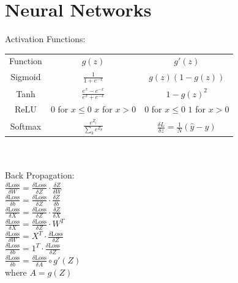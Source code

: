 \documentclass[a4paper, 10pt, twocolumn]{article}
\begin{document}
\section{Neural Networks}
Activation Functions: \\ 
\begin{tabular}{c c c}
	Function & $g(z)$ & $g'(z)$ \\
	Sigmoid & $\frac{1}{1 + e^{-x}}$ & $g(z)(1-g(z))$ \\
	Tanh & $\frac{e^x  - e^{-x}}{e^x + e^{-x}}$ & $1-g(z)^2$ \\
	ReLU & \thead{$0$ for $x \leq 0 $ \\ $x$ for $x>0$} & \thead{$0$ for $x \leq 0 $ \\ $1$ for $x>0$} \\
	Softmax & $\frac{e^{Z_i}}{\sum_k e^{Z_k}}$ & $\frac{\delta L}{\delta z} = \frac{1}{N} (\hat y - y)$
\end{tabular} \\ \\
Back Propagation:\\
$\frac{\delta \textrm{Loss}}{\delta W} = \frac{\delta \textrm{Loss}}{\delta Z} \cdot \frac{\delta Z}{\delta W}$ \\
$\frac{\delta \textrm{Loss}}{\delta b} = \frac{\delta \textrm{Loss}}{\delta Z} \cdot \frac{\delta Z}{\delta b}$ \\
$\frac{\delta \textrm{Loss}}{\delta X} = \frac{\delta \textrm{Loss}}{\delta Z} \cdot \frac{\delta Z}{\delta X}$ \\
$\frac{\delta \textrm{Loss}}{\delta X} = \frac{\delta \textrm{Loss}}{\delta Z} \cdot W^T$ \\
$\frac{\delta \textrm{Loss}}{\delta W} = X^T \cdot \frac{\delta \textrm{Loss}}{\delta Z}$ \\
$\frac{\delta \textrm{Loss}}{\delta b} = 1^T \cdot \frac{\delta \textrm{Loss}}{\delta Z}$ \\
$\frac{\delta \textrm{Loss}}{\delta b} = \frac{\delta \textrm{Loss}}{\delta A} \circ g'(Z)$ \\
where $A = g(Z)$
\end{document}

